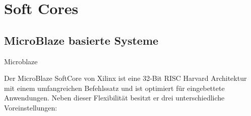 %
%
%
%

\chapter{Soft Cores}\label{kap:softcores}
\section{MicroBlaze basierte Systeme}\label{kap:microblaze}
Microblaze

Der MicroBlaze SoftCore von Xilinx ist eine 32-Bit RISC Harvard Architektur mit einem umfangreichen Befehlssatz und ist optimiert für eingebettete Anwendungen.
Neben dieser Flexibilität besitzt er drei unterschiedliche Voreinstellungen:

